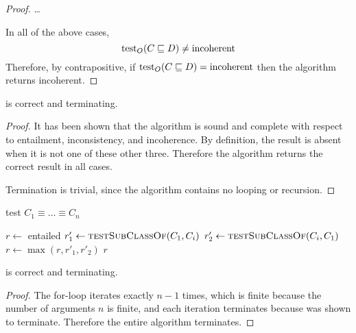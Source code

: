 \documentclass[paper.tex]{subfiles}
\begin{document}
\begin{proof}



  \dots \todo

  In all of the above cases,
  \[ \operatorname{test}_O(C \sqsubseteq D) \ne \mathrm{incoherent} \]
  Therefore, by contrapositive, if $\operatorname{test}_O(C \sqsubseteq D) = \mathrm{incoherent}$ then the algorithm returns incoherent.
\end{proof}

\begin{theorem}
   is correct and terminating.
\end{theorem}
\begin{proof}
  It has been shown that the algorithm is sound and complete with respect to entailment, inconsistency, and incoherence.  By definition, the result is absent when it is not one of these other three.  Therefore the algorithm returns the correct result in all cases.

  Termination is trivial, since the algorithm contains no looping or recursion.
\end{proof}


\begin{algorithm}[H]
  \caption{test $C_1 \equiv \ldots \equiv C_n$}
  \begin{algorithmic}[1]
    \raggedright
      \State $r \gets$ entailed
        \State $r'_1 \gets \Call{testSubClassOf}{C_1, C_i}$
        \State $r'_2 \gets \Call{testSubClassOf}{C_i, C_1}$
        \State $r \gets \max(r, r'_1, r'_2)$
      \EndFor
      \State \Return $r$
    \EndFunction
  \end{algorithmic}
\end{algorithm}

\begin{theorem}
   is correct and terminating.
\end{theorem}
\begin{proof}

  The for-loop iterates exactly $n - 1$ times, which is finite because the number of arguments $n$ is finite, and each iteration terminates because  was shown to terminate.  Therefore the entire algorithm terminates.
\end{proof}
\end{document}
